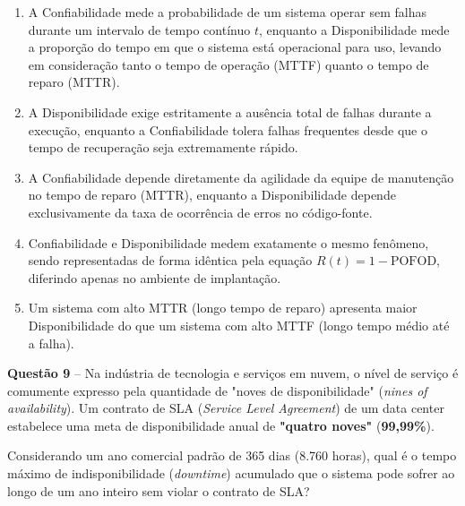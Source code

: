 \documentclass[12pt,a4paper]{article}
\begin{document}
\begin{enumerate}[label=\textbf{(\Alph*)}]
    \item A Confiabilidade mede a probabilidade de um sistema operar sem falhas durante um intervalo de tempo contínuo $t$, enquanto a Disponibilidade mede a proporção do tempo em que o sistema está operacional para uso, levando em consideração tanto o tempo de operação (MTTF) quanto o tempo de reparo (MTTR).

    \item A Disponibilidade exige estritamente a ausência total de falhas durante a execução, enquanto a Confiabilidade tolera falhas frequentes desde que o tempo de recuperação seja extremamente rápido.

    \item A Confiabilidade depende diretamente da agilidade da equipe de manutenção no tempo de reparo (MTTR), enquanto a Disponibilidade depende exclusivamente da taxa de ocorrência de erros no código-fonte.

    \item Confiabilidade e Disponibilidade medem exatamente o mesmo fenômeno, sendo representadas de forma idêntica pela equação $R(t) = 1 - \text{POFOD}$, diferindo apenas no ambiente de implantação.

    \item Um sistema com alto MTTR (longo tempo de reparo) apresenta maior Disponibilidade do que um sistema com alto MTTF (longo tempo médio até a falha).
\end{enumerate}

\vspace{0.5cm}

\textbf{Questão 9} -- Na indústria de tecnologia e serviços em nuvem, o nível de serviço é comumente expresso pela quantidade de "noves de disponibilidade" (\textit{nines of availability}). Um contrato de SLA (\textit{Service Level Agreement}) de um data center estabelece uma meta de disponibilidade anual de \textbf{"quatro noves"} (\textbf{99,99\%}).

\vspace{0.2cm}

Considerando um ano comercial padrão de 365 dias (8.760 horas), qual é o tempo máximo de indisponibilidade (\textit{downtime}) acumulado que o sistema pode sofrer ao longo de um ano inteiro sem violar o contrato de SLA?
\end{document}
